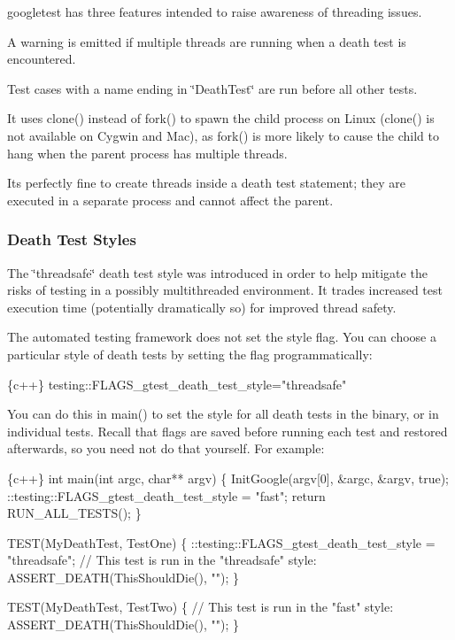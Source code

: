 googletest has three features intended to raise awareness of threading issues.


\begin{DoxyEnumerate}
\item A warning is emitted if multiple threads are running when a death test is encountered.
\item Test cases with a name ending in \char`\"{}\+Death\+Test\char`\"{} are run before all other tests.
\item It uses {\ttfamily clone()} instead of {\ttfamily fork()} to spawn the child process on Linux ({\ttfamily clone()} is not available on Cygwin and Mac), as {\ttfamily fork()} is more likely to cause the child to hang when the parent process has multiple threads.
\end{DoxyEnumerate}

It\textquotesingle{}s perfectly fine to create threads inside a death test statement; they are executed in a separate process and cannot affect the parent.

\subsubsection*{Death Test Styles}

The \char`\"{}threadsafe\char`\"{} death test style was introduced in order to help mitigate the risks of testing in a possibly multithreaded environment. It trades increased test execution time (potentially dramatically so) for improved thread safety.

The automated testing framework does not set the style flag. You can choose a particular style of death tests by setting the flag programmatically\+:


\begin{DoxyCode}
\{c++\}
testing::FLAGS\_gtest\_death\_test\_style="threadsafe"
\end{DoxyCode}


You can do this in {\ttfamily main()} to set the style for all death tests in the binary, or in individual tests. Recall that flags are saved before running each test and restored afterwards, so you need not do that yourself. For example\+:


\begin{DoxyCode}
\{c++\}
int main(int argc, char** argv) \{
  InitGoogle(argv[0], &argc, &argv, true);
  ::testing::FLAGS\_gtest\_death\_test\_style = "fast";
  return RUN\_ALL\_TESTS();
\}

TEST(MyDeathTest, TestOne) \{
  ::testing::FLAGS\_gtest\_death\_test\_style = "threadsafe";
  // This test is run in the "threadsafe" style:
  ASSERT\_DEATH(ThisShouldDie(), "");
\}

TEST(MyDeathTest, TestTwo) \{
  // This test is run in the "fast" style:
  ASSERT\_DEATH(ThisShouldDie(), "");
\}
\end{DoxyCode}


